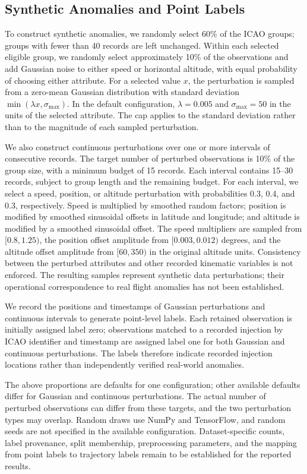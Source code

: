 \documentclass[iicol,pdflatex,sn-basic,Numbered]{sn-jnl}%
\theoremstyle{thmstyleone}%
\theoremstyle{thmstyletwo}%
\theoremstyle{thmstylethree}%
\begin{document}
\subsection{Synthetic Anomalies and Point Labels}

To construct synthetic anomalies, we randomly select 60\% of the ICAO groups; groups with fewer than 40 records are left unchanged.
Within each selected eligible group, we randomly select approximately 10\% of the observations and add Gaussian noise to either speed or horizontal altitude, with equal probability of choosing either attribute.
For a selected value $x$, the perturbation is sampled from a zero-mean Gaussian distribution with standard deviation $\min(\lambda x,\sigma_{\max})$. 
In the default configuration, $\lambda=0.005$ and $\sigma_{\max}=50$ in the units of the selected attribute. The cap applies to the standard deviation rather than to the magnitude of each sampled perturbation.

We also construct continuous perturbations over one or more intervals of consecutive records. 
The target number of perturbed observations is 10\% of the group size, with a minimum budget of 15 records. Each interval contains 15--30 records, subject to group length and the remaining budget.
For each interval, we select a speed, position, or altitude perturbation with probabilities 0.3, 0.4, and 0.3, respectively.
Speed is multiplied by smoothed random factors; position is modified by smoothed sinusoidal offsets in latitude and longitude; and altitude is modified by a smoothed sinusoidal offset. 
The speed multipliers are sampled from $[0.8,1.25)$, the position offset amplitude from $[0.003,0.012)$ degrees, and the altitude offset amplitude from $[60,350)$ in the original altitude units.
Consistency between the perturbed attributes and other recorded kinematic variables is not enforced. 
The resulting samples represent synthetic data perturbations; their operational correspondence to real flight anomalies has not been established.

We record the positions and timestamps of Gaussian perturbations and continuous intervals to generate point-level labels. 
Each retained observation is initially assigned label zero; observations matched to a recorded injection by ICAO identifier and timestamp are assigned label one for both Gaussian and continuous perturbations. 
The labels therefore indicate recorded injection locations rather than independently verified real-world anomalies.

The above proportions are defaults for one configuration; other available defaults differ for Gaussian and continuous perturbations. The actual number of perturbed observations can differ from these targets, and the two perturbation types may overlap. Random draws use NumPy and TensorFlow, and random seeds are not specified in the available configuration. Dataset-specific counts, label provenance, split membership, preprocessing parameters, and the mapping from point labels to trajectory labels remain to be established for the reported results.
\end{document}
